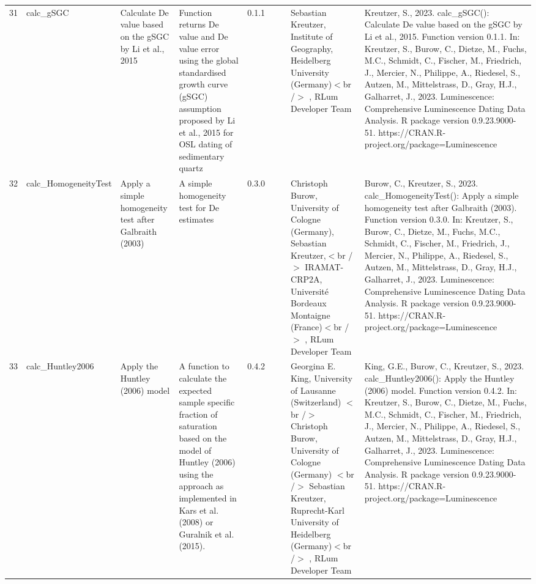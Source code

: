 \begin{table}[ht]
\begin{tabular}{rllllllll}
 \\ 
  31 & calc\_gSGC & Calculate De value based on the gSGC by Li et al., 2015 & Function returns De value and De value error using the global standardised growth curve (gSGC) assumption proposed by Li et al., 2015 for OSL dating of sedimentary quartz & 0.1.1
 &  &  & Sebastian Kreutzer, Institute of Geography, Heidelberg University (Germany)$<$br /$>$ , RLum Developer Team & Kreutzer, S., 2023. calc\_gSGC(): Calculate De value based on the gSGC by Li et al., 2015. Function version 0.1.1. In: Kreutzer, S., Burow, C., Dietze, M., Fuchs, M.C., Schmidt, C., Fischer, M., Friedrich, J., Mercier, N., Philippe, A., Riedesel, S., Autzen, M., Mittelstrass, D., Gray, H.J., Galharret, J., 2023. Luminescence: Comprehensive Luminescence Dating Data Analysis. R package version 0.9.23.9000-51. https://CRAN.R-project.org/package=Luminescence
 \\ 
  32 & calc\_HomogeneityTest & Apply a simple homogeneity test after Galbraith (2003) & A simple homogeneity test for De estimates & 0.3.0
 &  &  & Christoph Burow, University of Cologne (Germany), Sebastian Kreutzer,$<$br /$>$ IRAMAT-CRP2A, Université Bordeaux Montaigne (France)$<$br /$>$ , RLum Developer Team & Burow, C., Kreutzer, S., 2023. calc\_HomogeneityTest(): Apply a simple homogeneity test after Galbraith (2003). Function version 0.3.0. In: Kreutzer, S., Burow, C., Dietze, M., Fuchs, M.C., Schmidt, C., Fischer, M., Friedrich, J., Mercier, N., Philippe, A., Riedesel, S., Autzen, M., Mittelstrass, D., Gray, H.J., Galharret, J., 2023. Luminescence: Comprehensive Luminescence Dating Data Analysis. R package version 0.9.23.9000-51. https://CRAN.R-project.org/package=Luminescence
 \\ 
  33 & calc\_Huntley2006 & Apply the Huntley (2006) model & A function to calculate the expected sample specific fraction of saturation based on the model of Huntley (2006) using the approach as implemented in Kars et al. (2008) or Guralnik et al. (2015). & 0.4.2
 &  &  & Georgina E. King, University of Lausanne (Switzerland)  $<$br /$>$ Christoph Burow, University of Cologne (Germany)  $<$br /$>$ Sebastian Kreutzer, Ruprecht-Karl University of Heidelberg (Germany)$<$br /$>$ , RLum Developer Team & King, G.E., Burow, C., Kreutzer, S., 2023. calc\_Huntley2006(): Apply the Huntley (2006) model. Function version 0.4.2. In: Kreutzer, S., Burow, C., Dietze, M., Fuchs, M.C., Schmidt, C., Fischer, M., Friedrich, J., Mercier, N., Philippe, A., Riedesel, S., Autzen, M., Mittelstrass, D., Gray, H.J., Galharret, J., 2023. Luminescence: Comprehensive Luminescence Dating Data Analysis. R package version 0.9.23.9000-51. https://CRAN.R-project.org/package=Luminescence

\end{tabular}
\end{table}
